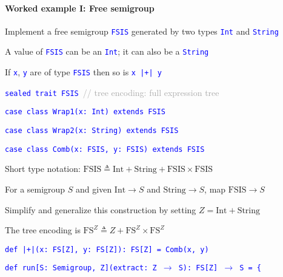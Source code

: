 \paragraph{Worked example I: Free semigroup}

Implement a free semigroup \texttt{\textcolor{blue}{\footnotesize{}FSIS}}
generated by two types \texttt{\textcolor{blue}{\footnotesize{}Int}}
and \texttt{\textcolor{blue}{\footnotesize{}String}} 

A value of \texttt{\textcolor{blue}{\footnotesize{}FSIS}} can be an
\texttt{\textcolor{blue}{\footnotesize{}Int}}; it can also be a \texttt{\textcolor{blue}{\footnotesize{}String}} 

If \texttt{\textcolor{blue}{\footnotesize{}x}}, \texttt{\textcolor{blue}{\footnotesize{}y}}
are of type \texttt{\textcolor{blue}{\footnotesize{}FSIS}} then so
is \texttt{\textcolor{blue}{\footnotesize{}x |+| y}} 

\texttt{\textcolor{blue}{\footnotesize{}sealed trait FSIS }}\textcolor{darkgray}{\footnotesize{}//
tree encoding: full expression tree}{\footnotesize\par}

\texttt{\textcolor{blue}{\footnotesize{}case class Wrap1(x: Int) extends
FSIS}}{\footnotesize\par}

\texttt{\textcolor{blue}{\footnotesize{}case class Wrap2(x: String)
extends FSIS}}{\footnotesize\par}

\texttt{\textcolor{blue}{\footnotesize{}case class Comb(x: FSIS, y: FSIS)
extends FSIS}}{\footnotesize\par}

Short type notation: $\text{FSIS}\triangleq\text{Int}+\text{String}+\text{FSIS}\times\text{FSIS}$ 

For a semigroup $S$ and given $\text{Int}\rightarrow S$ and $\text{String}\rightarrow S$,
map $\text{FSIS}\rightarrow S$

Simplify and generalize this construction by setting $Z=\text{Int}+\text{String}$

The tree encoding is $\text{FS}^{Z}\triangleq Z+\text{FS}^{Z}\times\text{FS}^{Z}$

\texttt{\textcolor{blue}{\footnotesize{}def |+|(x: FS{[}Z{]}, y: FS{[}Z{]}): FS{[}Z{]}
= Comb(x, y)}}{\footnotesize\par}

\texttt{\textcolor{blue}{\footnotesize{}def run{[}S: Semigroup, Z{]}(extract: Z
$\rightarrow$ S): FS{[}Z{]} $\rightarrow$ S = \{}}{\footnotesize\par}

